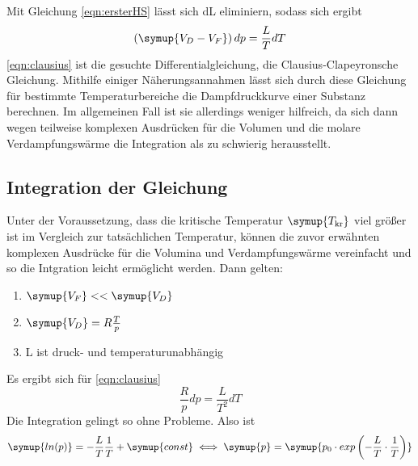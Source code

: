Mit Gleichung \eqref{eqn:ersterHS} lässt sich dL eliminiern, sodass sich ergibt
\begin{equation}
    \left( \symup{ V_D - V_F} \right) dp = \frac{L}{T} dT
    \label{eqn:clausius}
\end{equation}
\eqref{eqn:clausius} ist die gesuchte Differentialgleichung, die Clausius-Clapeyronsche
Gleichung. Mithilfe einiger Näherungsannahmen lässt sich durch diese Gleichung
für bestimmte Temperaturbereiche die Dampfdruckkurve einer Substanz berechnen. Im 
allgemeinen Fall ist sie allerdings weniger hilfreich, da sich dann wegen teilweise
komplexen Ausdrücken für die Volumen und die molare Verdampfungswärme die Integration
als zu schwierig herausstellt.

\subsection{Integration der Gleichung}
Unter der Voraussetzung, dass die kritische Temperatur $\symup{T_\text{kr}}$ viel größer
ist im Vergleich zur tatsächlichen Temperatur, können die zuvor erwähnten komplexen
Ausdrücke für die Volumina und Verdampfungswärme vereinfacht und so die Intgration 
leicht ermöglicht werden. Dann gelten:
\begin{enumerate}
    \item $\symup{V_F} << \symup{V_D}$
    \item $\symup{V_D} = R \frac{T}{p}$
    \item L ist druck- und temperaturunabhängig
\end{enumerate}
Es ergibt sich für \eqref{eqn:clausius}
\begin{equation*}
\frac{R}{p} dp = \frac{L}{T^2} dT
\end{equation*}
Die Integration gelingt so ohne Probleme. Also ist
\begin{equation}
\symup{ln(p)} = - \frac{L}{T} \frac{1}{T} + \symup{const}\\
\iff \symup{p} = \symup{p_0 \cdot exp \left( - \frac{L}{T} \cdot \frac{1}{T} \right)}
\end{equation}

